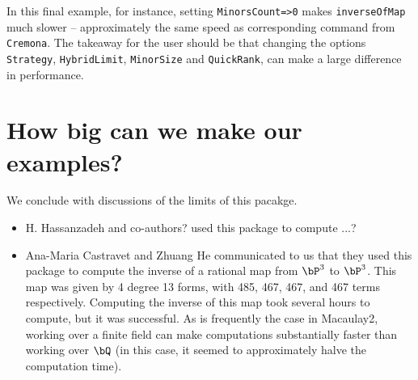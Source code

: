 \documentclass[11pt]{amsart}
\numberwithin{equation}{theorem}
\renewcommand{\:}{\colon}
\theoremstyle{theorem}
\begin{document}
{\color{black}\normalsize
In this final example, for instance, setting {\tt MinorsCount=>0} makes {\tt inverseOfMap} much slower -- approximately the same speed as corresponding command from {\tt Cremona}.
The takeaway for the user should be that changing the options {\tt Strategy}, {\tt HybridLimit}, {\tt MinorSize} and {\tt QuickRank}, can make a large difference in performance.

\section{How big can we make our examples?}

We conclude with discussions of the limits of this pacakge.

\begin{itemize}
  \item{} H. Hassanzadeh {\color{red} and co-authors?} used this package to compute ...?  \cite{}
  \item{} Ana-Maria Castravet and Zhuang He communicated to us that they used this package to compute the inverse of a rational map from $\bP^3$ to $\bP^3$.  This map was given by 4 degree 13 forms, with 485, 467, 467, and 467 terms respectively.  Computing the inverse of this map took several hours to compute, but it was successful.  As is frequently the case in Macaulay2, working over a finite field can make computations substantially faster than working over $\bQ$ (in this case, it seemed to approximately halve the computation time).  \cite{} 
\end{itemize}



}
\color{black}
\end{document}
